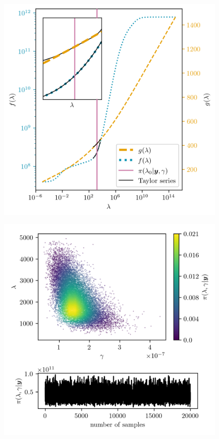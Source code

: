 \begin{figure}[ht!]
	\centering
	\includegraphics{f_and_g_phd.png}
	\caption[]{}
	\label{fig:}
\end{figure}


\begin{figure}[ht!]
	\centering
	\includegraphics{ScatterplusHistoPlusTT.png}
	\caption[]{}
	\label{fig:}
\end{figure}


